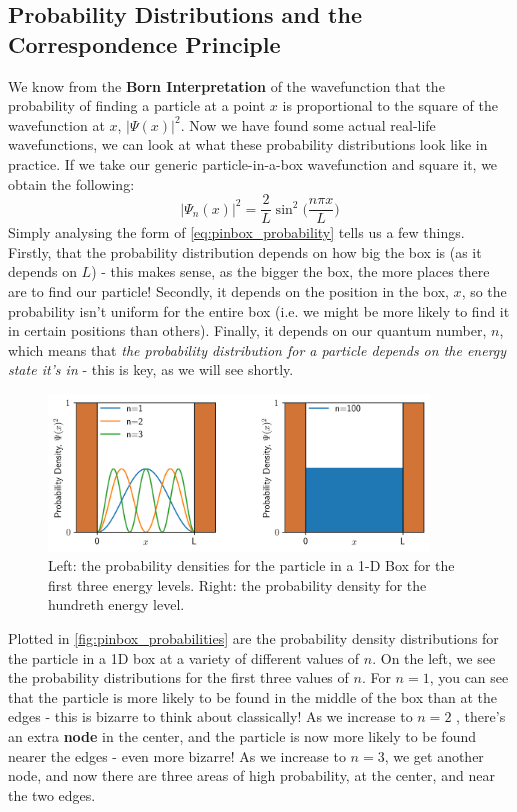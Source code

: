 \documentclass{memoir}[11pt,oneside,a4paper,openany]
\newcommand{\wf}{\ensuremath{\Psi}\xspace}
\begin{document}
\subsection{Probability Distributions and the Correspondence Principle}
We know from the \textbf{Born Interpretation} of the wavefunction that the probability of finding a particle at a point $x$ is proportional to the square of the wavefunction at $x$, $\lvert \wf(x) \rvert^2$. Now we have found some actual real-life wavefunctions, we can look at what these probability distributions look like in practice. If we take our generic particle-in-a-box wavefunction and square it, we obtain the following:
\begin{equation}\label{eq:pinbox_probability}
	\lvert \wf_n(x) \rvert^2 = \frac{2}{L}\sin^2\bigg(\frac{n\pi x}{L}\bigg)
\end{equation}
Simply analysing the form of \autoref{eq:pinbox_probability} tells us a few things. Firstly, that the probability distribution depends on how big the box is (as it depends on $L$) - this makes sense, as the bigger the box, the more places there are to find our particle! Secondly, it depends on the position in the box, $x$, so the probability isn't uniform for the entire box (i.e. we might be more likely to find it in certain positions than others). Finally, it depends on our quantum number, $n$, which means that \emph{the probability distribution for a particle depends on the energy state it's in} - this is key, as we will see shortly. 
\begin{figure}[h]
	\centering
	\includegraphics[width=0.9\textwidth]{particle_in_box_probabilities}
	\caption{Left: the probability densities for the particle in a 1-D Box for the first three energy levels. Right: the probability density for the hundreth energy level.}\label{fig:pinbox_probabilities}
\end{figure}

Plotted in \autoref{fig:pinbox_probabilities} are the probability density distributions for the particle in a 1D box at a variety of different values of $n$. On the left, we see the probability distributions for the first three values of $n$. For $n=1$, you can see that the particle is more likely to be found in the middle of the box than at the edges - this is bizarre to think about classically! As we increase to $n=2$ , there's an extra \textbf{node} in the center, and the particle is now more likely to be found nearer the edges - even more bizarre! As we increase to $n=3$, we get another node, and now there are three areas of high probability, at the center, and near the two edges.
\end{document}
